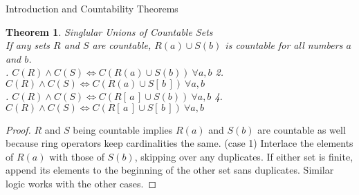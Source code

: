 \documentclass[12pt]{article}
\newtheorem{thm}{Theorem}
\begin{document}
\begin{section}{Introduction and Countability Theorems}
	\begin{thm}\label{thm:finite unions}
		\emph{
			Singlular Unions of Countable Sets\\
			\indent If any sets $R$ and $S$ are countable, $R(a)\cup S(b)$ is countable
			for all numbers $a$ and $b$.\vspace{0.4em}\\
			. $C(R)\land C(S)\iff C(R\left(a\right)\cup S\left(b\right))~\forall a,b$
			\hspace{1em}
			2. $C(R)\land C(S)\iff C(R\left(a\right)\cup S[\,b\,])~\forall a,b$\\
			. $C(R)\land C(S)\iff C(R[\,a\,]\cup S\left(b\right))~\forall a,b$
			\hspace{1em}
			4. $C(R)\land C(S)\iff C(R[\,a\,]\cup S[\,b\,])~\forall a,b$
		}
	\end{thm}\begin{proof}
		$R$ and $S$ being countable implies $R(a)$ and $S(b)$ are countable as well
		because ring operators keep cardinalities the same. (case 1) Interlace the elements of
		$R(a)$ with those of $S(b)$, skipping over any duplicates. If either set is
		finite, append its elements to the beginning of the other set sans duplicates.
		Similar logic works with the other cases.
	\end{proof}


\end{section}
\end{document}
